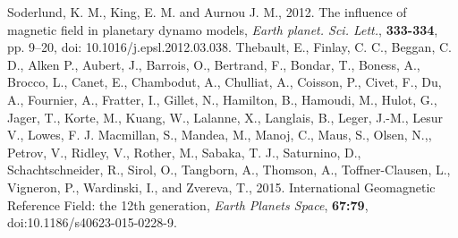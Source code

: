 \begin{thebibliography}{}
Soderlund, K. M., King, E. M. and Aurnou J. M., 2012. The influence of magnetic field in planetary dynamo models, {\it Earth planet. Sci. Lett.}, {\bf 333-334}, pp. 9--20, doi: 10.1016/j.epsl.2012.03.038.
%
Thebault, E., Finlay, C. C., Beggan, C. D., Alken P., Aubert, J., Barrois, O., Bertrand, F., Bondar, T., Boness, A., Brocco, L., Canet, E., Chambodut, A., Chulliat, A., Coisson, P., Civet, F., Du, A., Fournier, A., Fratter, I., Gillet, N., Hamilton, B., Hamoudi, M., Hulot, G., Jager, T., Korte, M., Kuang, W., Lalanne, X., Langlais, B., Leger, J.-M., Lesur V., Lowes, F. J. Macmillan, S., Mandea, M., Manoj, C., Maus, S., Olsen, N.,, Petrov, V., Ridley, V., Rother, M., Sabaka, T. J., Saturnino, D., Schachtschneider, R., Sirol, O., Tangborn, A., Thomson, A., Toffner-Clausen, L., Vigneron, P., Wardinski, I., and Zvereva, T., 2015. International Geomagnetic Reference Field: the 12th generation, {\it Earth Planets Space}, {\bf 67:79}, doi:10.1186/s40623-015-0228-9.
%

\end{thebibliography}
